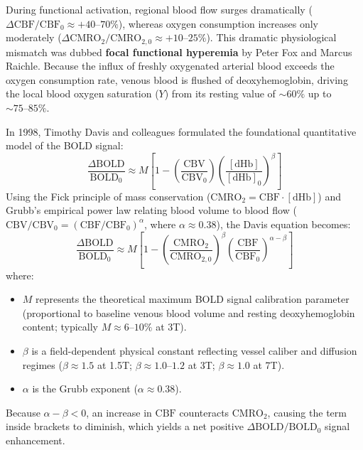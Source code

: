 \documentclass[11pt,a4paper]{article}
\begin{document}
During functional activation, regional blood flow surges dramatically ($\Delta \text{CBF} / \text{CBF}_0 \approx +40\text{--}70\%$), whereas oxygen consumption increases only moderately ($\Delta \text{CMRO}_2 / \text{CMRO}_{2,0} \approx +10\text{--}25\%$). This dramatic physiological mismatch was dubbed \textbf{focal functional hyperemia} by Peter Fox and Marcus Raichle. Because the influx of freshly oxygenated arterial blood exceeds the oxygen consumption rate, venous blood is flushed of deoxyhemoglobin, driving the local blood oxygen saturation ($Y$) from its resting value of $\sim 60\%$ up to $\sim 75\text{--}85\%$.

In 1998, Timothy Davis and colleagues formulated the foundational quantitative model of the BOLD signal:
\begin{equation}
    \frac{\Delta \text{BOLD}}{\text{BOLD}_0} \approx M \left[ 1 - \left(\frac{\text{CBV}}{\text{CBV}_0}\right) \left(\frac{[\text{dHb}]}{[\text{dHb}]_0}\right)^\beta \right]
\end{equation}
Using the Fick principle of mass conservation ($\text{CMRO}_2 = \text{CBF} \cdot [\text{dHb}]$) and Grubb's empirical power law relating blood volume to blood flow ($\text{CBV} / \text{CBV}_0 = (\text{CBF} / \text{CBF}_0)^\alpha$, where $\alpha \approx 0.38$), the Davis equation becomes:
\begin{equation}
    \frac{\Delta \text{BOLD}}{\text{BOLD}_0} \approx M \left[ 1 - \left(\frac{\text{CMRO}_2}{\text{CMRO}_{2,0}}\right)^\beta \left(\frac{\text{CBF}}{\text{CBF}_0}\right)^{\alpha - \beta} \right]
\end{equation}
where:
\begin{itemize}
    \item $M$ represents the theoretical maximum BOLD signal calibration parameter (proportional to baseline venous blood volume and resting deoxyhemoglobin content; typically $M \approx 6\text{--}10\%$ at 3T).
    \item $\beta$ is a field-dependent physical constant reflecting vessel caliber and diffusion regimes ($\beta \approx 1.5$ at 1.5T; $\beta \approx 1.0\text{--}1.2$ at 3T; $\beta \approx 1.0$ at 7T).
    \item $\alpha$ is the Grubb exponent ($\alpha \approx 0.38$).
\end{itemize}
Because $\alpha - \beta < 0$, an increase in $\text{CBF}$ counteracts $\text{CMRO}_2$, causing the term inside brackets to diminish, which yields a net positive $\Delta \text{BOLD} / \text{BOLD}_0$ signal enhancement.
\end{document}
